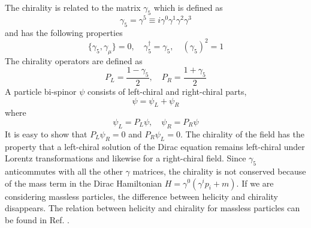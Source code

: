 \documentclass[12pt]{report}
\begin{document}
The chirality is related to the matrix $\gamma_{5}$ which is defined as
\begin{equation}
\gamma_{5} = \gamma^{5} \equiv i \gamma^{0} \gamma^{1} \gamma^{2} \gamma^{3}
\end{equation}
and has the following properties
\begin{equation}
\{ \gamma_{5}, \gamma_{\mu} \} = 0, \quad 
\gamma_{5}^{\dagger} = \gamma_{5}, \quad 
(\gamma_{5})^{2} = 1
\end{equation}
The chirality operators are defined as
\begin{equation}
P_{L} = \frac{1 - \gamma_{5}}{2}, \quad 
P_{R} = \frac{1 + \gamma_{5}}{2}
\end{equation}
A particle bi-spinor $\psi$ consists of left-chiral and right-chiral parts,
\begin{equation}
\psi = \psi_{L} + \psi_{R}
\end{equation}
where
\begin{equation}
\psi_{L} = P_{L} \psi, \quad 
\psi_{R} = P_{R} \psi
\end{equation}
It is easy to show that $P_{L} \psi_{R} = 0$ and $P_{R} \psi_{L} = 0$.
The chirality of the field has the property that a left-chiral solution of the Dirac equation remains left-chiral under Lorentz transformations and likewise for a right-chiral field.
Since $\gamma_{5}$ anticommutes with all the other $\gamma$ matrices, the chirality is not conserved because of the mass term in the Dirac Hamiltonian $H = \gamma^{0} (\gamma^{i} p_{i} + m)$.
If we are considering massless particles, the difference between helicity and chirality disappears.
The relation between helicity and chirality for massless particles can be found in Ref. \cite{arXiv:1006.1718v2}.
\end{document}
